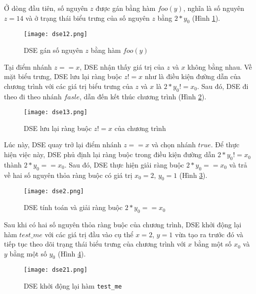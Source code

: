 Ở dòng đầu tiên, số nguyên $ z $ được gán bằng hàm $ foo(y) $, nghĩa là số nguyên $ z = 14 $ và ở trạng thái biểu trưng của số nguyên $ z $ bằng $ 2*y_{0} $ (Hình \ref{fig:dse12}).

\begin{figure}[H]	
	\begin{center}
		\texttt{[image: dse12.png]}
	\end{center}
	\caption{DSE gán số nguyên $ z $ bằng hàm $foo(y)$}
	\label{fig:dse12}	
\end{figure}

Tại điểm nhánh $z == x$, DSE nhận thấy giá trị của $ z $ và $ x $ không bằng nhau. Về mặt biểu trưng, DSE lưu lại ràng buộc $ z != x $ như là điều kiện đường dẫn của chương trình với các giá trị biểu trưng của $ z $ và $ x $ là $ 2*y_{0} != x_{0} $. Sau đó, DSE đi theo đi theo nhánh $ fasle $, dẫn đến kết thúc chương trình (Hình \ref{fig:dse13}).

\begin{figure}[H]	
	\begin{center}
		\texttt{[image: dse13.png]}
	\end{center}
	\caption{DSE lưu lại ràng buộc $ z != x $ của chương trình  }
	\label{fig:dse13}	
\end{figure}

Lúc này, DSE quay trở lại điểm nhánh $z == x$ và chọn nhánh $ true $. Để thực hiện việc này, DSE phủ định lại ràng buộc trong điều kiện đường dẫn $2*y_{0} != x_{0}$ thành $2*y_{0} == x_{0}$. Sau đó, DSE thực hiện giải ràng buộc $2*y_{0} == x_{0}$ và trả về hai số nguyên thỏa ràng buộc có giá trị $ x_{0} = 2$, $ y_{0} = 1 $ (Hình \ref{fig:dse2}).

\begin{figure}[H]	
	\begin{center}
		\texttt{[image: dse2.png]}
	\end{center}
	\caption{DSE tính toán và giải ràng buộc $2*y_{0} == x_{0}$}
	\label{fig:dse2}	
\end{figure}

Sau khi có hai số nguyên thỏa ràng buộc của chương trình, DSE khởi động lại hàm $ test\_me $ với các giá trị đầu vào cụ thể $x = 2$, $y = 1$ vừa tạo ra trước đó và tiếp tục theo dõi trạng thái biểu trưng của chương trình với $ x $ bằng một số $x_{0}$ và $ y $ bằng một số $y_{0}$ (Hình \ref{fig:dse21}).

\begin{figure}[H]	
	\begin{center}
		\texttt{[image: dse21.png]}
	\end{center}
	\caption{DSE khởi động lại hàm \texttt{test\_me}}
	\label{fig:dse21}		
\end{figure}

